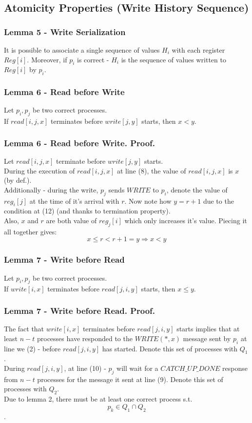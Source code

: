 \subsection{Atomicity Properties (Write History Sequence)}
\begin{frame}
    \frametitle{Lemma 5 - Write Serialization}
    \begin{lemma}
        It is possible to associate a single sequence of values $H_i$
        with each register $Reg[i]$. Moreover, if $p_i$ is correct -
        $H_i$ is the sequence of values written to $Reg[i]$ by $p_i$.
    \end{lemma}
\end{frame}
\begin{frame}
    \frametitle{Lemma 6 - Read before Write}
    \begin{lemma}
        Let $p_i, p_j$ be two correct processes.\\
        If $read[i,j,x]$ terminates before $write[j,y]$ starts, then $x<y$.
    \end{lemma}
\end{frame}
\begin{frame}
    \frametitle{Lemma 6 - Read before Write. Proof.}
        Let $read[i,j,x]$ terminate before $write[j,y]$ starts.\\
        During the execution of $read[i,j,x]$ at line (8), the value of $read[i,j,x]$
        is $x$ (by def.).\\
        Additionally - during the write, $p_j$ sends $WRITE$ to
        $p_i$, denote the value of $reg_i[j]$ at the time of it's arrival
        with $r$. Now note how $y=r+1$ due to the condition at (12) (and thanks to termination property).\\
        Also, $x$ and $r$ are both value of $reg_j[i]$ which only increases it's value.
        Piecing it all together gives:
        \[
            x\leq r<r+1=y \Rightarrow x<y
        \]
\end{frame}
\begin{frame}
    \frametitle{Lemma 7 - Write before Read}
    \begin{lemma}
        Let $p_i, p_j$ be two correct processes.\\
        If $write[i,x]$ terminates before $read[j,i,y]$ starts, then $x\leq y$.
    \end{lemma}
\end{frame}
\begin{frame}
    \frametitle{Lemma 7 - Write before Read. Proof.}
    The fact that $write[i,x]$ terminates before $read[j,i,y]$ starts
    implies that at least $n-t$ processes have responded to the
    $WRITE(*,x)$ message sent by $p_i$ at line we (2) - before $read[j,i,y]$ has started. Denote
    this set of processes with \alert{$Q_1$}.\\
    During $read[j,i,y]$, at line (10) - $p_j$ will wait for a $CATCH\_UP\_DONE$ response from
    $n-t$ processes for the message it sent at line (9).
    Denote this set of processes with \alert{$Q_2$}.\\
    Due to lemma 2, there must be at least one correct process s.t. \alert{
        \[p_k\in Q_1\cap Q_2\]
    }.
\end{frame}
